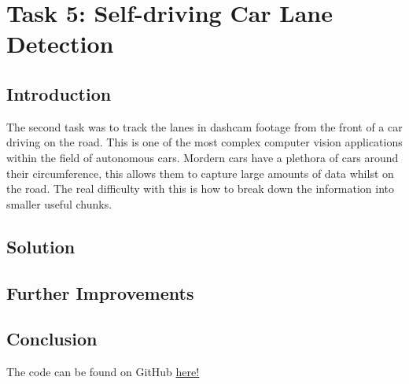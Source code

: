 \documentclass[conference]{IEEEtran}
\begin{document}
\section{Task 5: Self-driving Car Lane Detection}

\subsection{Introduction}

The second task was to track the lanes in dashcam footage from the front of a car driving on the road. This is one of the most complex computer vision applications within the field of autonomous cars. Mordern cars have a plethora of cars around their circumference, this allows them to capture large amounts of data whilst on the road. The real difficulty with this is how to break down the information into smaller useful chunks.  

\subsection{Solution}
\subsection{Further Improvements}
\subsection{Conclusion}




The code can be found on GitHub \href{https://github.com/LukeDWaller99/Aint308}{here!} 

\onecolumn

\begin{appendix}

\end{appendix}
\end{document}
